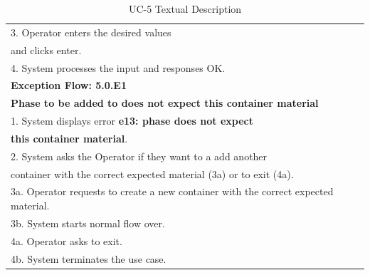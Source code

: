 \begin{table}[h]
\begin{center}
\begin{tabular}{|l|l|}
\\ 3. Operator enters the desired values \\and clicks enter.
\\ 4. System processes the input and responses OK.\\ \hline
\textbf{Exception Flow: 5.0.E1}
\\ \textbf{Phase to be added to does not expect this container material}
\\ 1. System displays error \textbf{e13: phase does not expect} \\ \textbf{this container material}.
\\ 2. System asks the Operator if they want to a add another \\container with the correct expected material (3a) or to exit (4a).
\\ 3a. Operator requests to create a new container with the correct expected material.
\\ 3b. System starts normal flow over.
\\ 4a. Operator asks to exit.
\\ 4b. System terminates the use case.\\ \hline
\end{tabular}
\end{center}
\caption {UC-5 Textual Description}
\label{tbl:uc5td}
\end{table}

